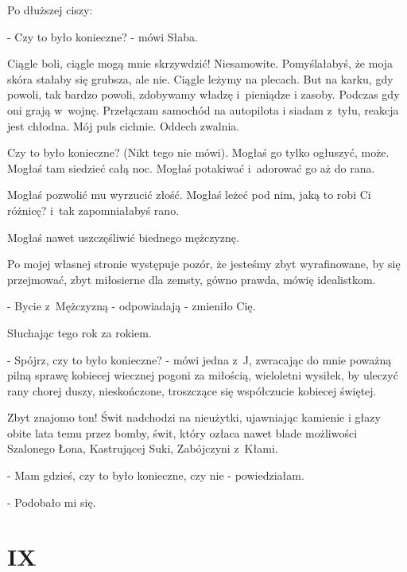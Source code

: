 \documentclass[oneside,polish,12pt,sfheadings]{mwbk}
\begin{document}
Po dłuższej ciszy: 

- Czy to było konieczne? - mówi Słaba.

Ciągle boli, ciągle mogą mnie skrzywdzić! Niesamowite. Pomyślałabyś,
że moja skóra stałaby się grubsza, ale nie. Ciągle leżymy na plecach.
But na karku, gdy powoli, tak bardzo powoli, zdobywamy władzę i~pieniądze
i zasoby. Podczas gdy oni grają w~wojnę. Przełączam samochód na autopilota
i siadam z~tyłu, reakcja jest chłodna. Mój puls cichnie. Oddech zwalnia.

Czy to było konieczne? (Nikt tego nie mówi). Mogłaś go tylko ogłuszyć,
może. Mogłaś tam siedzieć całą noc. Mogłaś potakiwać i~adorować go
aż do rana.

Mogłaś pozwolić mu wyrzucić złość. Mogłaś leżeć pod nim, jaką to robi
Ci różnicę? i~tak zapomniałabyś rano.

Mogłaś nawet uszczęśliwić biednego mężczyznę.

Po mojej własnej stronie występuje pozór, że jesteśmy zbyt wyrafinowane,
by się przejmować, zbyt miłosierne dla zemsty, gówno prawda, mówię
idealistkom. 

- Bycie z~Mężczyzną - odpowiadają - zmieniło Cię.

Słuchając tego rok za rokiem.

- Spójrz, czy to było konieczne? - mówi jedna z~J, zwracając do mnie
poważną pilną sprawę kobiecej wiecznej pogoni za miłością, wieloletni
wysiłek, by uleczyć rany chorej duszy, nieskończone, troszczące się
współczucie kobiecej świętej.

Zbyt znajomo ton! Świt nadchodzi na nieużytki, ujawniając kamienie
i głazy obite lata temu przez bomby, świt, który ozłaca nawet blade
możliwości Szalonego Łona, Kastrującej Suki, Zabójczyni z~Kłami.

- Mam gdzieś, czy to było konieczne, czy nie - powiedziałam.

- Podobało mi się.

\chapter{IX}
\end{document}
